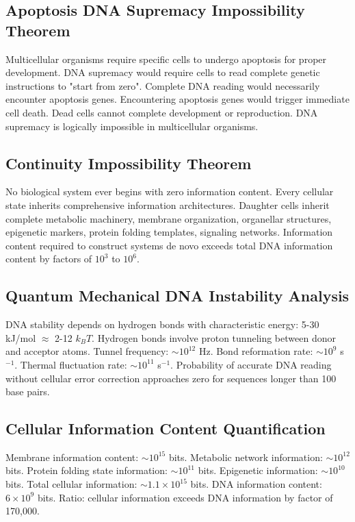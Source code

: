 \documentclass[12pt,a4paper]{article}
\begin{document}
\subsection{Apoptosis DNA Supremacy Impossibility Theorem}

Multicellular organisms require specific cells to undergo apoptosis for proper development. DNA supremacy would require cells to read complete genetic instructions to "start from zero". Complete DNA reading would necessarily encounter apoptosis genes. Encountering apoptosis genes would trigger immediate cell death. Dead cells cannot complete development or reproduction. DNA supremacy is logically impossible in multicellular organisms.

\subsection{Continuity Impossibility Theorem}

No biological system ever begins with zero information content. Every cellular state inherits comprehensive information architectures. Daughter cells inherit complete metabolic machinery, membrane organization, organellar structures, epigenetic markers, protein folding templates, signaling networks. Information content required to construct systems de novo exceeds total DNA information content by factors of $10^3$ to $10^6$.

\subsection{Quantum Mechanical DNA Instability Analysis}

DNA stability depends on hydrogen bonds with characteristic energy: 5-30 kJ/mol $\approx$ 2-12 $k_BT$. Hydrogen bonds involve proton tunneling between donor and acceptor atoms. Tunnel frequency: $\sim 10^{12}$ Hz. Bond reformation rate: $\sim 10^9$ s$^{-1}$. Thermal fluctuation rate: $\sim 10^{11}$ s$^{-1}$. Probability of accurate DNA reading without cellular error correction approaches zero for sequences longer than 100 base pairs.

\subsection{Cellular Information Content Quantification}

Membrane information content: $\sim 10^{15}$ bits. Metabolic network information: $\sim 10^{12}$ bits. Protein folding state information: $\sim 10^{11}$ bits. Epigenetic information: $\sim 10^{10}$ bits. Total cellular information: $\sim 1.1 \times 10^{15}$ bits. DNA information content: $6 \times 10^9$ bits. Ratio: cellular information exceeds DNA information by factor of 170,000.
\end{document}
